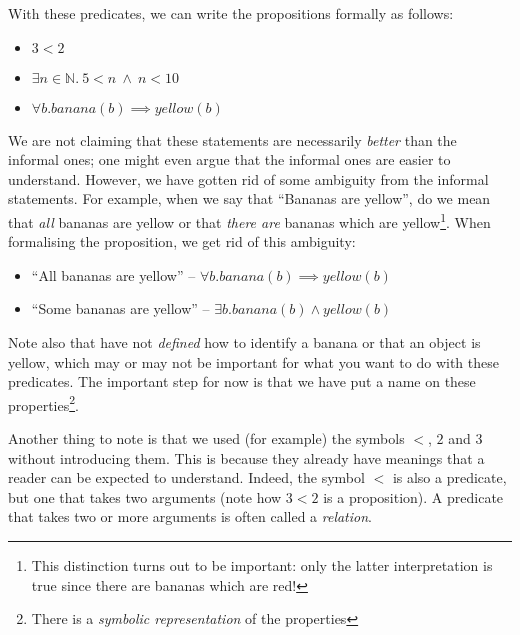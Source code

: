 \documentclass{tufte-handout}
\newcounter{example}
\begin{document}

With these predicates, we can write the propositions formally as
follows:

\begin{itemize}
\item $3 < 2$
\item $\exists n \in \mathbb{N} .~ 5 < n ~\land~ n < 10$
\item $\forall b. \mathit{banana}(b) \implies \mathit{yellow}(b)$
\end{itemize}

\noindent
We are not claiming that these statements are necessarily
\emph{better} than the informal ones; one might even argue that
the informal ones are easier to understand. However, we have
gotten rid of some ambiguity from the informal statements.
%
For example, when we say that ``Bananas are yellow'', do we mean
that \emph{all} bananas are yellow or that \emph{there are}
bananas which are yellow\footnote{This distinction turns out to be
  important: only the latter interpretation is true since there
  are bananas which are red!}. When formalising the proposition,
we get rid of this ambiguity:

\begin{itemize}
\item ``All bananas are yellow'' -- $\forall b. \mathit{banana}(b) \implies \mathit{yellow}(b)$
\item ``Some bananas are yellow'' -- $\exists b. \mathit{banana}(b) \land \mathit{yellow}(b)$
\end{itemize}

\noindent
Note also that have not \emph{defined} how to identify a banana or
that an object is yellow, which may or may not be important for
what you want to do with these predicates. The important step for
now is that we have put a name on these properties\footnote{There
  is a \emph{symbolic representation} of the properties}.

Another thing to note is that we used (for example) the symbols
$<$, $2$ and $3$ without introducing them. This is because they
already have meanings that a reader can be expected to understand.
Indeed, the symbol $<$ is also a predicate, but one that takes two
arguments (note how $3 < 2$ is a proposition). A predicate that
takes two or more arguments is often called a \emph{relation}.
\end{document}
